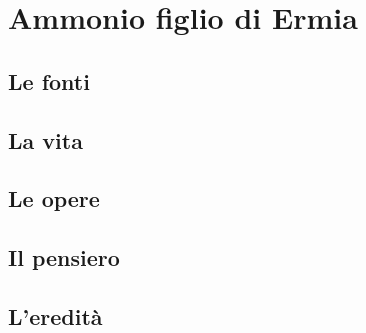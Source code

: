 \chapter{Ammonio figlio di Ermia}

\section{Le fonti}

\section{La vita}

\section{Le opere}

\section{Il pensiero}

\section{L'eredità}

